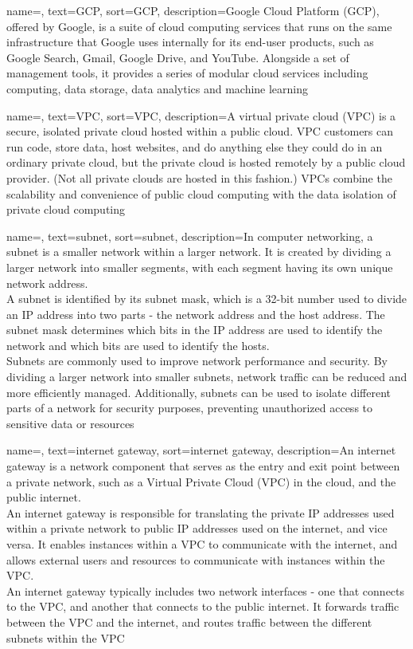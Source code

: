 {
    name=,
    text=GCP,
    sort=GCP,
    description={Google Cloud Platform (GCP), offered by Google, is a suite of cloud computing services that runs on the same infrastructure that Google uses internally for its end-user products, such as Google Search, Gmail, Google Drive, and YouTube. Alongside a set of management tools, it provides a series of modular cloud services including computing, data storage, data analytics and machine learning}
}

{
    name=,
    text=VPC,
    sort=VPC,
    description={A virtual private cloud (VPC) is a secure, isolated private cloud hosted within a public cloud. VPC customers can run code, store data, host websites, and do anything else they could do in an ordinary private cloud, but the private cloud is hosted remotely by a public cloud provider. (Not all private clouds are hosted in this fashion.) VPCs combine the scalability and convenience of public cloud computing with the data isolation of private cloud computing}
}

{
    name=,
    text=subnet,
    sort=subnet,
    description={In computer networking, a subnet is a smaller network within a larger network. It is created by dividing a larger network into smaller segments, with each segment having its own unique network address.\\
    A subnet is identified by its subnet mask, which is a 32-bit number used to divide an IP address into two parts - the network address and the host address. The subnet mask determines which bits in the IP address are used to identify the network and which bits are used to identify the hosts.\\
    Subnets are commonly used to improve network performance and security. By dividing a larger network into smaller subnets, network traffic can be reduced and more efficiently managed. Additionally, subnets can be used to isolate different parts of a network for security purposes, preventing unauthorized access to sensitive data or resources}
}

{
    name=,
    text=internet gateway,
    sort=internet gateway,
    description={An internet gateway is a network component that serves as the entry and exit point between a private network, such as a Virtual Private Cloud (VPC) in the cloud, and the public internet.\\
    An internet gateway is responsible for translating the private IP addresses used within a private network to public IP addresses used on the internet, and vice versa. It enables instances within a VPC to communicate with the internet, and allows external users and resources to communicate with instances within the VPC.\\    
    An internet gateway typically includes two network interfaces - one that connects to the VPC, and another that connects to the public internet. It forwards traffic between the VPC and the internet, and routes traffic between the different subnets within the VPC}
}


